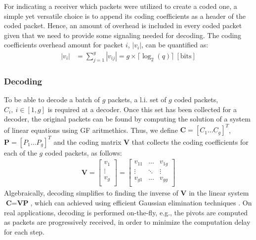 For indicating a receiver which packets were utilized
to create a coded one, a simple yet versatile choice is to append
its coding coefficients as a header of the coded packet. Hence, an
amount of overhead is included in every coded packet given that we
need to provide some signaling needed for decoding. The coding
coefficients overhead amount for packet $i$, $|v_i|$, can be quantified
as:
%
\begin{align} \label{eq:coded_packet_coef}
|v_i| &= \sum_{j=1}^{g} |v_{ij}| = g \times \lceil \log_{2} (q)
\rceil ~ [\mathrm{bits}]
\end{align}

\subsubsection{Decoding}
\label{sssec:decoding}
To be able to decode a batch of $g$ packets, a \ac{l.i.} set of $g$
coded packets, $C_i,\ i \in [1,g]$ is required at a decoder.
Once this set has been collected for a decoder,
the original packets can be found by computing the solution of a system
of linear equations using \ac{GF} aritmethics. Thus, we define
$\textbf{C} = \left[C_1 \ldots C_g \right]^T$,
$\textbf{P} = \left[P_1 \ldots P_g \right]^T$ and the coding matrix
$\textbf{V}$ that collects the coding coefficients for each of the $g$
coded packets, as follows:
%
\begin{align} \label{eq:coding_matrix}
\textbf{V} =
\left[
\begin{array}{c}
        v_1    \\ \hline
        \vdots \\ \hline
        v_g    \\
\end{array}
\right]
=
\left[
\begin{array}{ccc}
        v_{11} & \ldots & v_{1g} \\
        \vdots  & \ddots & \vdots  \\
        v_{g1} & \ldots & v_{gg} \\
\end{array}
\right]
\end{align}
%
Algebraically, decoding simplifies to finding the inverse of
$\textbf{V}$ in the linear system
$\textbf{C} = \textbf{V} \textbf{P}$, which can achieved using
efficient Gaussian elimination techniques \cite{fragouli2006network}.
On real applications, decoding is performed on-the-fly, e.g., the pivots are
computed as packets are progressively received, in order to minimize the
computation delay for each step.

